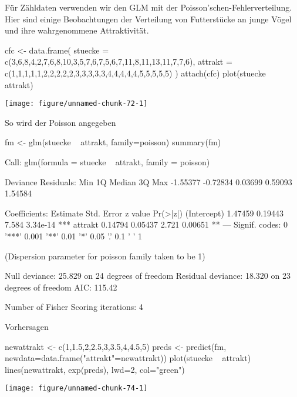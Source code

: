 \documentclass[a4paper,twoside]{tufte-book}\usepackage[]{graphicx}\usepackage[]{color}
\makeatletter
\def\maxwidth{ %
	\ifdim\Gin@nat@width>\linewidth
	\linewidth
	\else
	\Gin@nat@width
	\fi
}
\makeatother
\begin{document}
\begin{appendices}
Für Zähldaten verwenden wir den GLM mit der Poisson'schen-Fehlerverteilung. Hier sind einige Beobachtungen der Verteilung von Futterstücke an junge Vögel und ihre wahrgenommene Attraktivität.

\begin{Schunk}
\begin{Sinput}
cfc <- data.frame(
  stuecke = c(3,6,8,4,2,7,6,8,10,3,5,7,6,7,5,6,7,11,8,11,13,11,7,7,6),
  attrakt = c(1,1,1,1,1,2,2,2,2,2,3,3,3,3,3,4,4,4,4,4,5,5,5,5,5) 
)
attach(cfc)
plot(stuecke ~ attrakt)
\end{Sinput}

\texttt{[image: figure/unnamed-chunk-72-1]} \end{Schunk}

So wird der Poisson angegeben

\begin{Schunk}
\begin{Sinput}
fm <- glm(stuecke ~ attrakt, family=poisson)
summary(fm)
\end{Sinput}
\begin{Soutput}

Call:
glm(formula = stuecke ~ attrakt, family = poisson)

Deviance Residuals: 
     Min        1Q    Median        3Q       Max  
-1.55377  -0.72834   0.03699   0.59093   1.54584  

Coefficients:
            Estimate Std. Error z value Pr(>|z|)    
(Intercept)  1.47459    0.19443   7.584 3.34e-14 ***
attrakt      0.14794    0.05437   2.721  0.00651 ** 
---
Signif. codes:  0 '***' 0.001 '**' 0.01 '*' 0.05 '.' 0.1 ' ' 1

(Dispersion parameter for poisson family taken to be 1)

    Null deviance: 25.829  on 24  degrees of freedom
Residual deviance: 18.320  on 23  degrees of freedom
AIC: 115.42

Number of Fisher Scoring iterations: 4
\end{Soutput}
\end{Schunk}

Vorhersagen

\begin{Schunk}
\begin{Sinput}
newattrakt <- c(1,1.5,2,2.5,3,3.5,4,4.5,5)
preds <- predict(fm, newdata=data.frame("attrakt"=newattrakt))
plot(stuecke ~ attrakt)
lines(newattrakt, exp(preds), lwd=2, col="green")
\end{Sinput}

\texttt{[image: figure/unnamed-chunk-74-1]} \end{Schunk}


\end{appendices}
\end{document}
